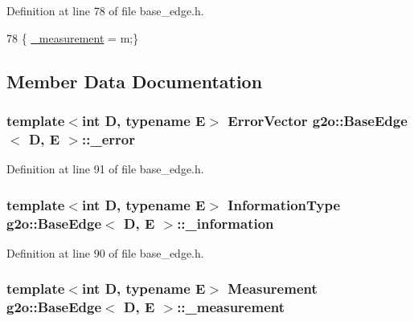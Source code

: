 Definition at line 78 of file base\+\_\+edge.\+h.


\begin{DoxyCode}
78 \{ \hyperlink{classg2o_1_1BaseEdge_af2a6ab1df6e91601b4cab23e0e99e034}{\_measurement} = m;\}
\end{DoxyCode}


\subsection{Member Data Documentation}
\subsubsection[{\texorpdfstring{\+\_\+error}{_error}}]{\setlength{\rightskip}{0pt plus 5cm}template$<$int D, typename E$>$ {\bf Error\+Vector} {\bf g2o\+::\+Base\+Edge}$<$ D, E $>$\+::\+\_\+error\hspace{0.3cm}{\ttfamily [protected]}}\hypertarget{classg2o_1_1BaseEdge_af31f4b0a67bb12b4de4a32dc42467836}{}\label{classg2o_1_1BaseEdge_af31f4b0a67bb12b4de4a32dc42467836}


Definition at line 91 of file base\+\_\+edge.\+h.

\subsubsection[{\texorpdfstring{\+\_\+information}{_information}}]{\setlength{\rightskip}{0pt plus 5cm}template$<$int D, typename E$>$ {\bf Information\+Type} {\bf g2o\+::\+Base\+Edge}$<$ D, E $>$\+::\+\_\+information\hspace{0.3cm}{\ttfamily [protected]}}\hypertarget{classg2o_1_1BaseEdge_a49f11e3d1eaa8e666e1d4d3607279377}{}\label{classg2o_1_1BaseEdge_a49f11e3d1eaa8e666e1d4d3607279377}


Definition at line 90 of file base\+\_\+edge.\+h.

\subsubsection[{\texorpdfstring{\+\_\+measurement}{_measurement}}]{\setlength{\rightskip}{0pt plus 5cm}template$<$int D, typename E$>$ {\bf Measurement} {\bf g2o\+::\+Base\+Edge}$<$ D, E $>$\+::\+\_\+measurement\hspace{0.3cm}{\ttfamily [protected]}}\hypertarget{classg2o_1_1BaseEdge_af2a6ab1df6e91601b4cab23e0e99e034}{}\label{classg2o_1_1BaseEdge_af2a6ab1df6e91601b4cab23e0e99e034}


